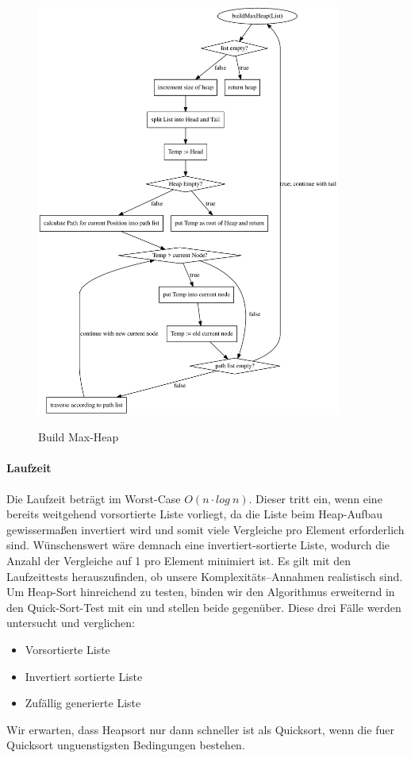 \begin{figure}[hbtp]
    \caption{Build Max-Heap}
    \centering
    \includegraphics[width = 10cm]{buildMaxHeap.pdf}\label{fig:buildMaxHeap}
\end{figure}

\paragraph{Laufzeit}\label{subsec:Hlaufzeit}
Die Laufzeit beträgt im Worst-Case \(O(n\cdot log\ n)\). Dieser tritt
ein, wenn eine bereits weitgehend vorsortierte Liste vorliegt, da die
Liste beim Heap-Aufbau gewissermaßen invertiert wird und somit viele
Vergleiche pro Element erforderlich sind.
Wünschenswert wäre demnach eine invertiert-sortierte Liste, wodurch die
Anzahl der Vergleiche auf 1 pro Element minimiert ist.
Es gilt mit den Laufzeittests herauszufinden, ob unsere
Komplexitäts--Annahmen realistisch sind.
Um Heap-Sort hinreichend zu testen, binden wir den Algorithmus erweiternd
in den Quick-Sort-Test mit ein und stellen beide gegenüber.
Diese drei Fälle werden untersucht und verglichen:
\begin{samepage}
    \begin{itemize}
        \item Vorsortierte Liste
        \item Invertiert sortierte Liste
        \item Zufällig generierte Liste
    \end{itemize}
Wir erwarten, dass Heapsort nur dann schneller ist als Quicksort, wenn die fuer Quicksort unguenstigsten Bedingungen bestehen.
\end{samepage}
\FloatBarrier
